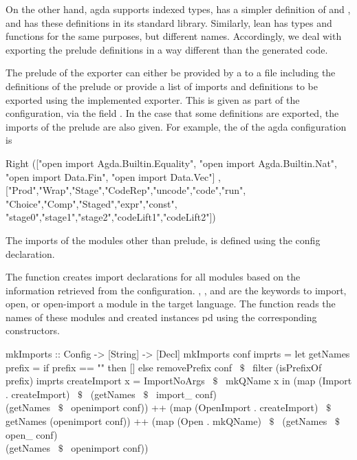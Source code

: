On the other hand, agda supports indexed types, has a simpler definition of  and , and has these definitions in its standard library. Similarly, lean has types and functions for the same purposes, but different names. Accordingly, we deal with exporting the prelude definitions in a way different than the generated code. 

The prelude of the exporter can either be provided by a  to a file including the definitions of the prelude or provide a list of imports and definitions to be exported using the implemented exporter. This is given as part of the configuration, via the field
. In the case that some definitions are exported, the imports of the prelude are also given. 
For example, the  of the agda configuration is 
\begin{hscode} 
 Right (["open import Agda.Builtin.Equality",
         "open import Agda.Builtin.Nat",
         "open import Data.Fin",
         "open import Data.Vec"]
      ,["Prod","Wrap","Stage","CodeRep","uncode","code","run",
        "Choice","Comp","Staged","expr","const",
        "stage0","stage1","stage2","codeLift1","codeLift2"])   
\end{hscode} 

The imports of the modules other than prelude, is defined using the  config declaration. 

The function  creates import declarations for all modules based on the information retrieved from the configuration. , , and  are the keywords to import, open, or open-import a module in the target language. The function reads the names of these modules and created instances pd  using the corresponding constructors. 
\begin{hscode}
mkImports :: Config -> [String] -> [Decl]
mkImports conf imprts =
  let getNames prefix =
        if prefix == "" then [] 
        else removePrefix conf ~$\$$~ filter (isPrefixOf prefix) imprts
       createImport x = ImportNoArgs ~$\$$~ mkQName x
  in (map (Import . createImport) ~$\$$~ 
         (getNames ~$\$$~ import_ conf) \\ (getNames ~$\$$~ openimport conf))
  ++ (map (OpenImport . createImport) ~$\$$~ getNames (openimport conf))
  ++ (map (Open . mkQName) ~$\$$~
         (getNames ~$\$$~ open_ conf) \\ (getNames ~$\$$~ openimport conf))
\end{hscode} 

